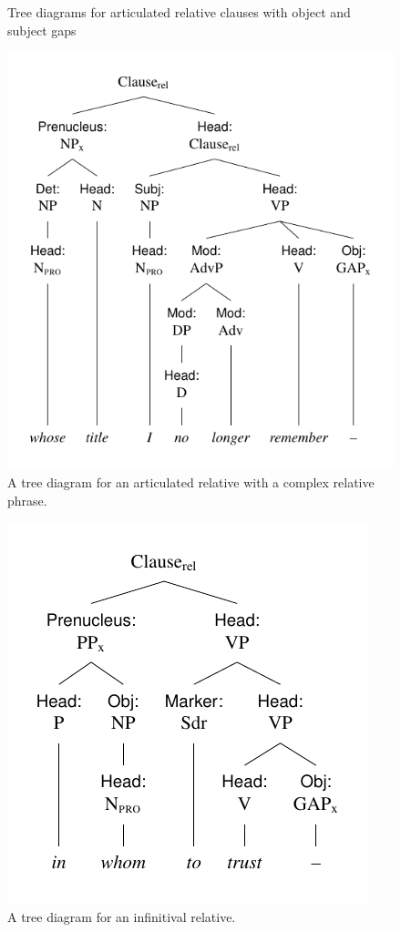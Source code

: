 \begin{figure}[ht]
    \caption{Tree diagrams for articulated relative clauses with object and subject gaps}
    \label{fig:who-met-us}
\end{figure}

\begin{figure}[ht]
    \centering
    \includegraphics{figures/whose-title-I-no-longer-remember.pdf}
    \caption{A tree diagram for an articulated relative with a complex relative phrase.}
    \label{fig:whose-title-I}
\end{figure}

\begin{figure}[ht]
    \centering
    \includegraphics{figures/in-whom-to-trust.pdf}
    \caption{A tree diagram for an infinitival relative.}
    \label{fig:in-whom-to-trust}
\end{figure}

